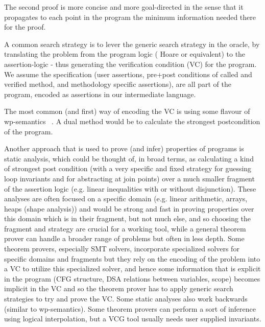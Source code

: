 The second proof is more concise and more goal-directed in the sense that it propagates to each point in the program the minimum information needed there for the proof.

A common search strategy is to lever the generic search strategy in the oracle, by translating the problem from the program logic ( Hoare or equivalent) to the assertion-logic - thus generating the verification condition (VC) for the program.
We assume the specification (user assertions, pre+post conditions of called and verified method, and methodology specific assertions), are all part of the program, encoded as assertions in our intermediate language.

The most common (and first) way of encoding the VC is using some flavour of wp-semantics ~\cite{Dijkstra:1975:GCN:360933.360975}.
A dual method would be to calculate the strongest postcondition of the program.

Another approach that is used to prove (and infer) properties of programs is static analysis, which could be thought of, in broad terms, as calculating a kind of strongest post condition (with a very specific and fixed strategy for guessing loop invariants and for abstracting at join points) over a much smaller fragment of the assertion logic (e.g. linear inequalities with or without disjunction).
These analyses are often focused on a specific domain (e.g. linear arithmetic, arrays, heaps (shape analysis)) and would be strong and fast in proving properties over this domain which is in their fragment, but not much else, and so choosing the fragment and strategy are crucial for a working tool, while a general theorem prover can handle a broader range of problems but often in less depth.
Some theorem provers, especially SMT solvers, incorporate specialized solvers for specific domains and fragments but they rely on the encoding of the problem into a VC to utilize this specialized solver, and hence some information that is explicit in the program (CFG structure, DSA relations between variables, scope) becomes implicit in the VC and so the theorem prover has to apply generic search strategies to try and prove the VC.
Some static analyses also work backwards (similar to wp-semantics).
Some theorem provers can perform a sort of inference using logical interpolation, but a VCG tool usually needs user supplied invariants.

